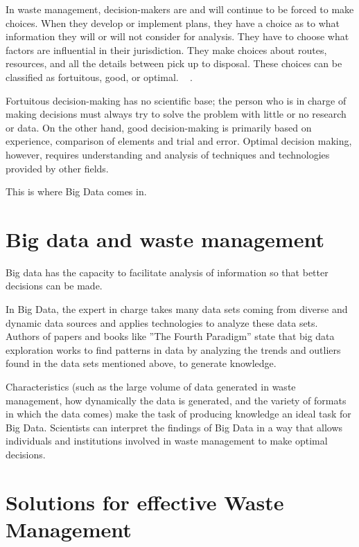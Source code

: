 \documentclass[sigconf]{acmart}
\begin{document}
In waste management, decision-makers are and will continue to be forced to make choices.  When they develop or implement plans, they have a choice as to what information they will or will not consider for analysis.  They have to choose what factors are influential in their jurisdiction.  They make choices about routes, resources, and all the details between pick up to disposal.  These choices can be classified as fortuitous, good, or optimal. ~\cite{akbarpour2016} .

Fortuitous decision-making has no scientific base; the person who is in charge of making decisions must always try to solve the problem with little or no research or data.   On the other hand, good decision-making is primarily based on experience, comparison of elements and trial and error.  Optimal decision making, however, requires understanding and analysis of techniques and technologies provided by other fields.   ~\cite{akbarpour2016} 

This is where Big Data comes in. 

\section{ Big data and waste management}

Big data has the capacity to facilitate analysis of information so that better decisions can be made.

In Big Data, the expert in charge takes many data sets coming from diverse and dynamic data sources and applies technologies to analyze these data sets.  Authors of papers and books like ''The Fourth Paradigm'' state that big data exploration works to find patterns in data by analyzing the trends and outliers found in the data sets mentioned above, to generate knowledge. ~\cite{hey2009fourth}

Characteristics (such as the large volume of data generated in waste management, how dynamically the data is generated, and the variety of formats in which the data comes) make the task of producing knowledge an ideal task for Big Data.  Scientists can interpret the findings of Big Data  in a way that allows individuals and institutions involved in waste management to make optimal decisions.~\cite{yenkar2014review}  

\section{Solutions for effective Waste Management}
\end{document}
